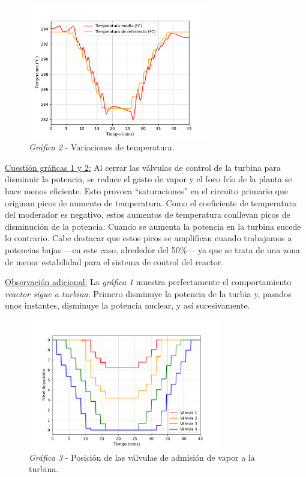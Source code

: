 \begin{figure}[h]
  \centering
  \includegraphics[width=0.7\textwidth]{content/figures/sim1_temperaturas.pdf}
  \vspace{-0.3cm}
  \caption{\textit{Gráfica 2} - Variaciones de temperatura.}
  \label{fig:sim1_temperaturas}
\end{figure}

\newpage
\underline{Cuestión gráficas 1 y 2:} Al cerrar las válvulas de control de la turbina para disminuir la potencia, se reduce el gasto de vapor y el foco frío de la planta se hace menos eficiente. Esto provoca ``saturaciones'' en el circuito primario que originan picos de aumento de temperatura. Como el coeficiente de temperatura del moderador es negativo, estos aumentos de temperatura conllevan picos de disminución de la potencia. Cuando se aumenta la potencia en la turbina sucede lo contrario. Cabe destacar que estos picos se amplifican cuando trabajamos a potencias bajas ---en este caso, alrededor del 50\%--- ya que se trata de una zona de menor estabilidad para el sistema de control del reactor.

\underline{Observación adicional:} La \textit{gráfica 1} muestra perfectamente el comportamiento \textit{reactor sigue a turbina}. Primero disminuye la potencia de la turbia y, pasados unos instantes, disminuye la potencia nuclear, y así sucesivamente.

\begin{figure}[!h]
  \centering
  \includegraphics[width=0.75\textwidth]{content/figures/sim1_valvulas_control.pdf}
  \caption{\textit{Gráfica 3} - Posición de las válvulas de admisión de vapor a la turbina.}
  \label{fig:sim1_valvulas_control}
\end{figure}

